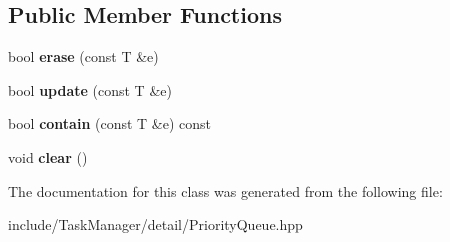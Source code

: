 \subsection*{Public Member Functions}
\begin{DoxyCompactItemize}
\item 
\mbox{\label{classTask_1_1Detail_1_1PriorityQueue_aa5659e1b7c5ca7b03421973ddb515c50}} 
bool {\bfseries erase} (const T \&e)
\item 
\mbox{\label{classTask_1_1Detail_1_1PriorityQueue_ad151f63dfc6b3f233fdc32d1e9cefc90}} 
bool {\bfseries update} (const T \&e)
\item 
\mbox{\label{classTask_1_1Detail_1_1PriorityQueue_a577cce55fe45052da1392e15db1431e4}} 
bool {\bfseries contain} (const T \&e) const
\item 
\mbox{\label{classTask_1_1Detail_1_1PriorityQueue_abbcbc1fe4e627576428e5d63ac565cec}} 
void {\bfseries clear} ()
\end{DoxyCompactItemize}


The documentation for this class was generated from the following file\+:\begin{DoxyCompactItemize}
\item 
include/\+Task\+Manager/detail/Priority\+Queue.\+hpp\end{DoxyCompactItemize}
